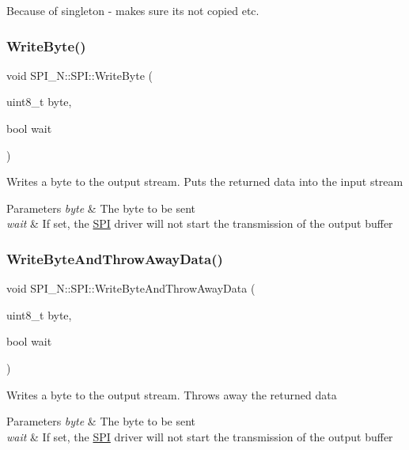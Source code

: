 Because of singleton -\/ makes sure its not copied etc. \hypertarget{class_s_p_i___n_1_1_s_p_i_a542dc8e88203de7040ce9926d06b9463}{}\label{class_s_p_i___n_1_1_s_p_i_a542dc8e88203de7040ce9926d06b9463} 
\subsubsection{\texorpdfstring{Write\+Byte()}{WriteByte()}}
{\footnotesize\ttfamily void S\+P\+I\+\_\+\+N\+::\+S\+P\+I\+::\+Write\+Byte (\begin{DoxyParamCaption}\item[{uint8\+\_\+t}]{byte,  }\item[{bool}]{wait }\end{DoxyParamCaption})}

Writes a byte to the output stream. Puts the returned data into the input stream 
\begin{DoxyParams}{Parameters}
{\em byte} & The byte to be sent \\
\hline
{\em wait} & If set, the \hyperlink{class_s_p_i___n_1_1_s_p_i}{S\+PI} driver will not start the transmission of the output buffer \\
\hline
\end{DoxyParams}
\hypertarget{class_s_p_i___n_1_1_s_p_i_a05bcca2e033422b2e6ad570320d03fcb}{}\label{class_s_p_i___n_1_1_s_p_i_a05bcca2e033422b2e6ad570320d03fcb} 
\subsubsection{\texorpdfstring{Write\+Byte\+And\+Throw\+Away\+Data()}{WriteByteAndThrowAwayData()}}
{\footnotesize\ttfamily void S\+P\+I\+\_\+\+N\+::\+S\+P\+I\+::\+Write\+Byte\+And\+Throw\+Away\+Data (\begin{DoxyParamCaption}\item[{uint8\+\_\+t}]{byte,  }\item[{bool}]{wait }\end{DoxyParamCaption})}

Writes a byte to the output stream. Throws away the returned data 
\begin{DoxyParams}{Parameters}
{\em byte} & The byte to be sent \\
\hline
{\em wait} & If set, the \hyperlink{class_s_p_i___n_1_1_s_p_i}{S\+PI} driver will not start the transmission of the output buffer \\
\hline
\end{DoxyParams}



